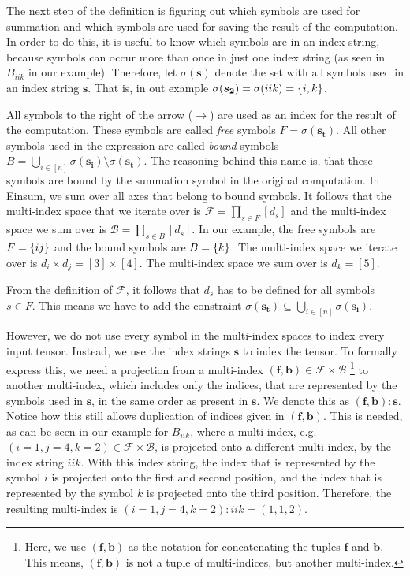 \begin{definition}
    The next step of the definition is figuring out which symbols are used for summation and which symbols are used for saving the result of the computation.
    In order to do this, it is useful to know which symbols are in an index string, because symbols can occur more than once in just one index string (as seen in $B_{iik}$ in our example).
    Therefore, let $\sigma(\bm{s})$ denote the set with all symbols used in an index string $\bm{s}$.
    That is, in out example $\sigma(\bm{s_2}) = \sigma(iik) = \lbrace i, k \rbrace$.

    All symbols to the right of the arrow ($\rightarrow$) are used as an index for the result of the computation.
    These symbols are called \textit{free} symbols $F = \sigma(\bm{s_t})$.
    All other symbols used in the expression are called \textit{bound} symbols $B = \bigcup_{i \in [n]} \sigma(\bm{s_i}) \setminus \sigma(\bm{s_t})$.
    The reasoning behind this name is, that these symbols are bound by the summation symbol in the original computation.
    In Einsum, we sum over all axes that belong to bound symbols.
    It follows that the multi-index space that we iterate over is $\mathcal{F} = \prod_{s \in F} [d_s]$ and the multi-index space we sum over is $\mathcal{B} = \prod_{s \in B} [d_s]$.
    In our example, the free symbols are $F = \lbrace ij \rbrace$ and the bound symbols are $B = \lbrace k \rbrace$.
    The multi-index space we iterate over is $d_i \times d_j = [3] \times [4]$.
    The multi-index space we sum over is $d_k = [5]$.

    From the definition of $\mathcal{F}$, it follows that $d_s$ has to be defined for all symbols $s \in F$.
    This means we have to add the constraint $\sigma(\bm{s_t}) \subseteq \bigcup_{i \in [n]} \sigma(\bm{s_i})$.

    However, we do not use every symbol in the multi-index spaces to index every input tensor.
    Instead, we use the index strings $\bm{s}$ to index the tensor.
    To formally express this, we need a projection from a multi-index $(\bm{f},\bm{b}) \in \mathcal{F} \times \mathcal{B}$
    \footnote{
        Here, we use $(\bm{f},\bm{b})$ as the notation for concatenating the tuples $\bm{f}$ and $\bm{b}$.
        This means, $(\bm{f},\bm{b})$ is not a tuple of multi-indices, but another multi-index.
    }
    to another multi-index, which includes only the indices, that are represented by the symbols used in $\bm{s}$,
    in the same order as present in $\bm{s}$.
    We denote this as $(\bm{f},\bm{b}):\bm{s}$.
    Notice how this still allows duplication of indices given in $(\bm{f},\bm{b})$.
    This is needed, as can be seen in our example for $B_{iik}$,
    where a multi-index, e.g. $(i=1,j=4,k=2) \in \mathcal{F} \times \mathcal{B}$, is projected onto a different multi-index, by the index string $iik$.
    With this index string, the index that is represented by the symbol $i$ is projected onto the first and second position,
    and the index that is represented by the symbol $k$ is projected onto the third position.
    Therefore, the resulting multi-index is $(i=1,j=4,k=2):iik = (1,1,2)$.


\end{definition}
